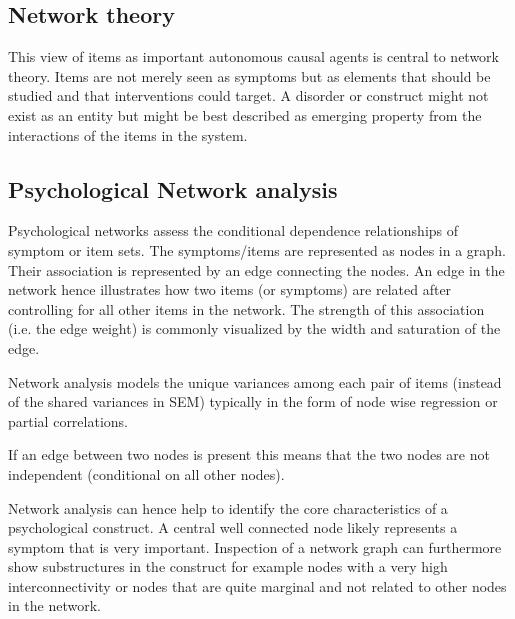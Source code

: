 \subsection{Network theory}
This view of items as important autonomous causal agents is central to network theory.
Items are not merely seen as symptoms but as elements that should be studied and that interventions could target.
A disorder or construct might not exist as an entity but might be best described as emerging property from the interactions of the items in the system. 

%


\subsection{Psychological Network analysis}
Psychological networks assess the conditional dependence relationships of symptom or item sets.
The symptoms/items are represented as nodes in a graph. 
Their association is represented by an edge connecting the nodes.  
An edge in the network hence illustrates how two items (or symptoms) are related after controlling for all other items in the network. The strength of this association (i.e. the edge weight) is commonly visualized by the width and saturation of the edge.

Network analysis models the unique variances among each pair of items (instead of the shared variances in SEM) typically in the form of node wise regression or partial correlations. 

If an edge between two nodes is present this means that the two nodes are not independent (conditional on all other nodes).

Network analysis can hence help to identify the core characteristics of a psychological construct. 
A central well connected node likely represents a symptom that is very important.
Inspection of a network graph can furthermore show substructures in the construct for example nodes with a very high interconnectivity or nodes that are quite marginal and not related to other nodes in the network.

